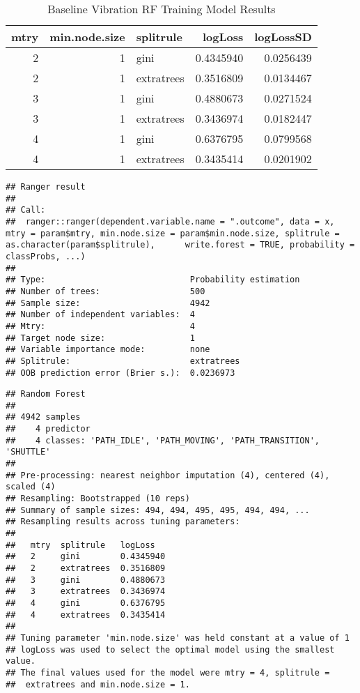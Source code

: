 \documentclass[]{article}
\begin{document}
\begin{table}[!h]

\caption{\label{tab:baseline-rf-params}Baseline Vibration RF Training Model Results}
\centering
\begin{tabular}[t]{rrlrr}
\toprule
mtry & min.node.size & splitrule & logLoss & logLossSD\\
\midrule
2 & 1 & gini & 0.4345940 & 0.0256439\\
2 & 1 & extratrees & 0.3516809 & 0.0134467\\
3 & 1 & gini & 0.4880673 & 0.0271524\\
3 & 1 & extratrees & 0.3436974 & 0.0182447\\
4 & 1 & gini & 0.6376795 & 0.0799568\\
4 & 1 & extratrees & 0.3435414 & 0.0201902\\
\bottomrule
\end{tabular}
\end{table}

\begin{verbatim}
## Ranger result
## 
## Call:
##  ranger::ranger(dependent.variable.name = ".outcome", data = x,      mtry = param$mtry, min.node.size = param$min.node.size, splitrule = as.character(param$splitrule),      write.forest = TRUE, probability = classProbs, ...) 
## 
## Type:                             Probability estimation 
## Number of trees:                  500 
## Sample size:                      4942 
## Number of independent variables:  4 
## Mtry:                             4 
## Target node size:                 1 
## Variable importance mode:         none 
## Splitrule:                        extratrees 
## OOB prediction error (Brier s.):  0.0236973
\end{verbatim}

\begin{verbatim}
## Random Forest 
## 
## 4942 samples
##    4 predictor
##    4 classes: 'PATH_IDLE', 'PATH_MOVING', 'PATH_TRANSITION', 'SHUTTLE' 
## 
## Pre-processing: nearest neighbor imputation (4), centered (4), scaled (4) 
## Resampling: Bootstrapped (10 reps) 
## Summary of sample sizes: 494, 494, 495, 495, 494, 494, ... 
## Resampling results across tuning parameters:
## 
##   mtry  splitrule   logLoss  
##   2     gini        0.4345940
##   2     extratrees  0.3516809
##   3     gini        0.4880673
##   3     extratrees  0.3436974
##   4     gini        0.6376795
##   4     extratrees  0.3435414
## 
## Tuning parameter 'min.node.size' was held constant at a value of 1
## logLoss was used to select the optimal model using the smallest value.
## The final values used for the model were mtry = 4, splitrule =
##  extratrees and min.node.size = 1.
\end{verbatim}
\end{document}
